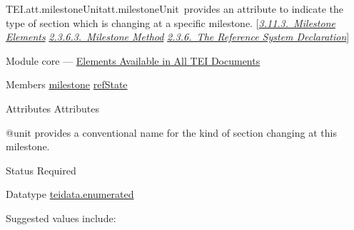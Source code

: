\begin{reflist}
\item[]\begin{specHead}{TEI.att.milestoneUnit}{att.milestoneUnit} provides an attribute to indicate the type of section which is changing at a specific milestone. [\textit{\hyperref[CORS5]{3.11.3.\ Milestone Elements}} \textit{\hyperref[HD54M]{2.3.6.3.\ Milestone Method}} \textit{\hyperref[HD54]{2.3.6.\ The Reference System Declaration}}]\end{specHead} 
    \item[{Module}]
  core — \hyperref[CO]{Elements Available in All TEI Documents}
    \item[{Members}]
  \hyperref[TEI.milestone]{milestone} \hyperref[TEI.refState]{refState}
    \item[{Attributes}]
  Attributes\hfil\\[-10pt]\begin{sansreflist}
    \item[@unit]
  provides a conventional name for the kind of section changing at this milestone.
\begin{reflist}
    \item[{Status}]
  Required
    \item[{Datatype}]
  \hyperref[TEI.teidata.enumerated]{teidata.enumerated}
    \item[{Suggested values include:}]
  \begin{description}


\end{description}
\end{reflist}
\end{sansreflist}
\end{reflist}
